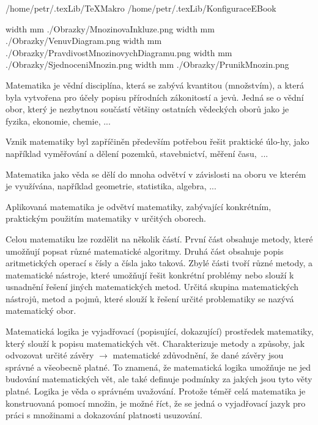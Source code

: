 \def\addr{/home/petr/.texLib/}

 \addr TeXMakro
\setAddress{\addr}
 \addr KonfiguraceEBook







\pdfximage width \the\SirkaOdstavce mm {./Obrazky/MnozinovaInkluze.png}
\pdfximage width \the\SirkaOdstavce mm {./Obrazky/VenuvDiagram.png}
\pdfximage width \the\SirkaOdstavce mm {./Obrazky/PravdivostMnozinovychDiagramu.png}
\pdfximage width \the\SirkaOdstavce mm {./Obrazky/SjednoceniMnozin.png}
\pdfximage width \the\SirkaOdstavce mm {./Obrazky/PrunikMnozin.png}


\Obsah


Matematika je vědní disciplína, která se zabývá kvantitou (množstvím), a která byla vytvořena pro účely popisu přírodních zákonitostí a jevů. Jedná se o vědní obor, který je nezbytnou součástí většiny ostatních vědeckých oborů jako je fyzika, ekonomie, chemie, ...

Vznik matematiky byl zapříčiněn především potřebou řešit praktické úlo-hy, jako například vyměřování a dělení pozemků, stavebnictví, měření času,~...

Matematika jako věda se dělí do mnoha odvětví v závislosti na oboru ve kterém je využívána, například geometrie, statistika, algebra, ...

Aplikovaná matematika je odvětví matematiky, zabývající konkrétním, praktickým použitím matematiky v určitých oborech.

Celou matematiku lze rozdělit na několik částí. První část obsahuje metody, které umožňují popsat různé matematické algoritmy. Druhá část obsahuje popis aritmetických operací s čísly a čísla jako taková. Zbylé části tvoří různé metody, a matematické nástroje, které umožňují řešit konkrétní problémy nebo slouží k usnadnění řešení jiných matematických metod. Určitá skupina matematických nástrojů, metod a pojmů, které slouží k řešení určité problematiky se nazývá matematický obor. 


Matematická logika je vyjadřovací (popisující, dokazující) prostředek matematiky, který slouží k popisu matematických vět. Charakterizuje metody a způsoby, jak odvozovat určité závěry $\rightarrow$ matematické zdůvodnění, že dané závěry jsou správné a všeobecně platné. To znamená, že matematická logika umožňuje ne jed budování matematických vět, ale také definuje podmínky za jakých jsou tyto věty platné. Logika je věda o správném uvažování. Protože téměř celá matematika je konstruovaná pomocí množin, je možné říct, že se jedná o vyjadřovací jazyk pro práci s množinami a dokazování platnosti usuzování. 

